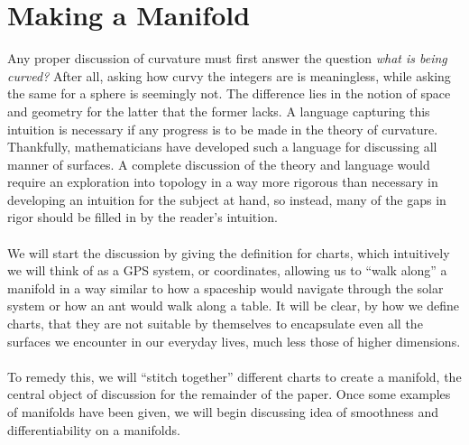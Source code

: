 \documentclass[]{article}
\newcommand\<{\ensuremath{\left\langle}}
\renewcommand\>{\ensuremath{\right\rangle}}
\theoremstyle{definition}
\theoremstyle{definition}
\begin{document}
	\section{Making a Manifold}
	Any proper discussion of curvature must first answer the question \textit{what is being curved?} After all, asking how curvy the integers are is meaningless, while asking the same for a sphere is seemingly not. The difference lies in the notion of space and geometry for the latter that the former lacks. A language capturing this intuition is necessary if any progress is to be made in the theory of curvature. Thankfully, mathematicians have developed such a language for discussing all manner of surfaces. A complete discussion of the theory and language would require an exploration into topology in a way more rigorous than necessary in developing an intuition for the subject at hand, so instead, many of the gaps in rigor should be filled in by the reader's intuition.\\
	\\
	We will start the discussion by giving the definition for charts, which intuitively we will think of as a GPS system, or coordinates, allowing us to ``walk along'' a manifold in a way similar to how a spaceship would navigate through the solar system or how an ant would walk along a table. It will be clear, by how we define charts, that they are not suitable by themselves to encapsulate even all the surfaces we encounter in our everyday lives, much less those of higher dimensions. \\
	\\
	To remedy this, we will ``stitch together'' different charts to create a manifold, the central object of discussion for the remainder of the paper. Once some examples of manifolds have been given, we will begin discussing idea of smoothness and differentiability on a manifolds.
\end{document}
